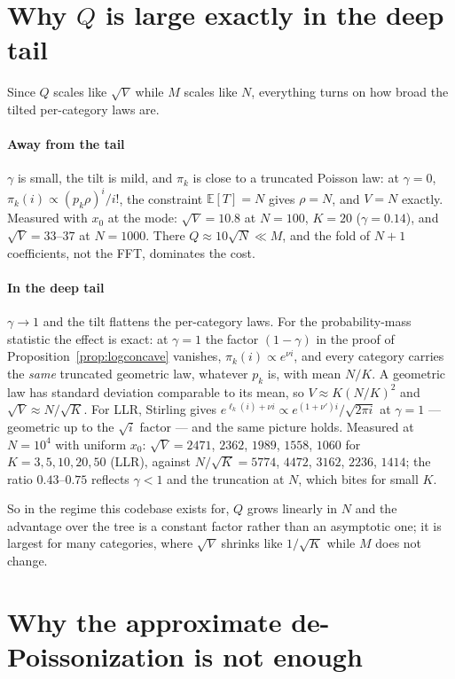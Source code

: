 \documentclass[11pt]{article}
\begin{document}
\section{Why $Q$ is large exactly in the deep tail}
\label{sec:variance}

Since $Q$ scales like $\sqrt V$ while $M$ scales like $N$, everything turns on how broad the tilted
per-category laws are.

\paragraph{Away from the tail} $\gamma$ is small, the tilt is mild, and $\pi_k$ is close to a
truncated Poisson law: at $\gamma=0$, $\pi_k(i)\propto(p_k\rho)^i/i!$, the constraint
$\mathbb E[T]=N$ gives $\rho=N$, and $V=N$ exactly. Measured with $x_0$ at the mode: $\sqrt V=10.8$
at $N=100$, $K=20$ ($\gamma=0.14$), and $\sqrt V=33$--$37$ at $N=1000$. There $Q\approx10\sqrt N\ll M$,
and the fold of $N+1$ coefficients, not the FFT, dominates the cost.

\paragraph{In the deep tail} $\gamma\to1$ and the tilt flattens the per-category laws. For the
probability-mass statistic the effect is exact: at $\gamma=1$ the factor $(1-\gamma)$ in the proof
of Proposition~\ref{prop:logconcave} vanishes, $\pi_k(i)\propto e^{\nu i}$, and every category carries
the \emph{same} truncated geometric law, whatever $p_k$ is, with mean $N/K$. A geometric law has
standard deviation comparable to its mean, so $V\approx K(N/K)^2$ and $\sqrt V\approx N/\sqrt K$. For LLR,
Stirling gives $e^{\ell_k(i)+\nu i}\propto e^{(1+\nu')i}/\sqrt{2\pi i}$ at $\gamma=1$ --- geometric up
to the $\sqrt i$ factor --- and the same picture holds. Measured at $N=10^4$ with uniform $x_0$:
$\sqrt V=2471$, $2362$, $1989$, $1558$, $1060$ for $K=3,5,10,20,50$ (LLR), against
$N/\sqrt K=5774$, $4472$, $3162$, $2236$, $1414$; the ratio $0.43$--$0.75$ reflects $\gamma<1$ and the
truncation at $N$, which bites for small $K$.

So in the regime this codebase exists for, $Q$ grows linearly in $N$ and the advantage over the tree
is a constant factor rather than an asymptotic one; it is largest for many categories, where
$\sqrt V$ shrinks like $1/\sqrt K$ while $M$ does not change.

\section{Why the approximate de-Poissonization is not enough}
\label{sec:approx}
\end{document}
